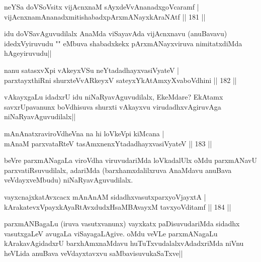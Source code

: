 \begin{shl}
neYSa doVSoV\s sitx vijAcnxnaM sAyxdeVvA\s \s nanadxgoVcaramf |\\
vijAcnxnamAnanadxmitishabadxpArxmANayxkAraNAtf \hfill || 181 ||
\end{shl}

\begin{artha}
idu doVSavAguvudilalx AnaMda viSayavAda vijAcnxnavu (anuBavavu) idedxVyiruvudu "\stext " eMbuva shabadxkekx pArxmANayxviruva nimitatxdiMda hAgeyiruvudu||
\end{artha}


\begin{shl}
nanu satasxvXpi vAkeyxVSu neYtadadhayxvasiVyateV |\\
parxtayxthiRni shurxteVvARkeyxV sateyxYkAtAmxyXvaboVdhini \hfill || 182 ||
\end{shl}

\begin{artha}
vAkayxgaLu idadxrU idu niNaRyavAguvudilalx, EkeMdare? EkAtamx savxrUpavanunx boVdhisuva shurxti vAkayxvu virudadhxvAgiruvAga niNaRyavAguvudilalx||
\end{artha}

\begin{shl}
mAnAnatxraviroVdheVna na hi loVkeV\s pi kiMcana |\\
mAnaM parxvataRteV tasAmxnenxYtadadhayxvasiVyateV \hfill || 183 ||
\end{shl}

\begin{artha}
beVre parxmANagaLa viroVdha viruvudariMda loVkadalUlx oMdu parxmANavU parxvatiRsuvudilalx, adariMda (barxhamxdalilxruva AnaMdavu anuBava veVdayxveMbudu) niNaRyavAguvudilalx. 
\end{artha}

\begin{shl}
vayxcnajxkatAvxcacx mAnAnAM sidadhxvasutxparxyoVjayxtA |\\
kArakatevxV\s payxkAyaRtAvxdudxHsaMBAvayxM tavxyoVditamf \hfill || 184 ||
\end{shl}

\begin{artha}%
parxmANBagaLu (iruva vasutxvanunx) vayxkatx paDisuvudariMda sidadhx vasutxgaLeV avugaLa viSayagaLAgive. oMdu veVLe parxmANagaLu kArakavAgidadxrU barxhAmxnaMdavu huTuTxvudalalxvAdadxriMda niVnu heVLida anuBava veVdayxtavxvu saMbavisuvukaSaTxve||
\end{artha}

